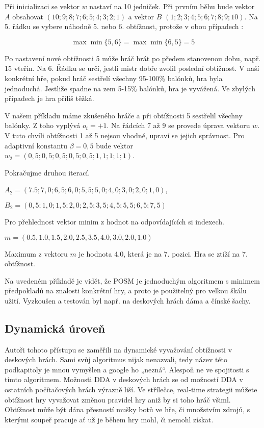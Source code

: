 Při inicializaci se vektor $w$ nastaví na 10 jedniček. Při prvním běhu bude vektor $A$ obsahovat $(10; 9; 8; 7; 6; 5; 4; 3; 2; 1)$ a vektor $B$ $(1; 2; 3; 4; 5; 6; 7; 8; 9; 10)$. Na 5. řádku se vybere náhodně 5. nebo 6. obtížnost, protože v obou případech :


	\[
	\max{\min{\{5, 6\}}} = \max{\min{\{6, 5\}}} = 5
\]

Po nastavení nové obtížnosti 5 může hráč hrát po předem stanovenou dobu, např. 15 vteřin. Na 6. Řádku se určí, jestli mistr dobře zvolil poslední obtížnost. V naší konkrétní hře, pokud hráč sestřelí všechny 95-100\% balónků, hra byla jednoduchá. Jestliže spadne na zem 5-15\% balónků, hra je vyvážená. Ve zbylých případech je hra příliš těžká.

V našem příkladu máme zkušeného hráče a při obtížnosti 5 sestřelil všechny balónky. Z toho vyplývá $o_t=+1$. Na řádcích 7 až 9 se provede úprava vektoru $w$. V tuto chvíli obtížnosti 1 až 5 nejsou vhodné, upraví se jejich správnost. Pro adaptivní konstantu $\beta=0,5$ bude vektor $w_2=(0,5;0,5;0,5;0,5;0,5;1,1;1;1;1)$.

Pokračujme druhou iterací. 

$A_2=(7.5;7,0;6,5;6,0;5,5;5,0;4,0;3,0;2,0;1,0)$, 

$B_2=(0,5;1,0;1,5;2,0;2,5;3,5;4,5;5,5;6,5;7,5)$

Pro přehlednost vektor minim z hodnot na odpovídajících si indexech.

$m=(0.5,1.0,1.5,2.0,2.5,3.5,4.0,3.0,2.0,1.0)$

Maximum z vektoru $m$ je hodnota 4.0, která je na 7. pozici. Hra se ztíží na 7. obtížnost.

Na uvedeném příkladě je vidět, že POSM je jednoduchým algoritmem s minimem předpokladů na znalosti konkrétní hry, a proto je použitelný pro velkou škálu užití. Vyzkoušen a testován byl např. na deskových hrách dáma a čínské šachy. \cite{23posm2}

\subsection{Dynamická úroveň}

Autoři tohoto přístupu se zaměřili na dynamické vyvažování obtížnosti v deskových hrách. \cite{24DynLev} Sami svůj algoritmus nijak nenazvali, tedy název této podkapitoly je mnou vymyšlen a google ho „nezná“. Alespoň ne ve spojitosti s tímto algoritmem.
Možnosti DDA v deskových hrách se od možností DDA v ostatních počítačových hrách výrazně liší. Ve střílečce, real-time strategii můžete obtížnost hry vyvažovat změnou pravidel hry aniž by si toho hráč všiml. Obtížnost může být dána přesností mušky botů ve hře, či množstvím zdrojů, s kterými soupeř pracuje ať už je během hry mohl, či nemohl získat.

